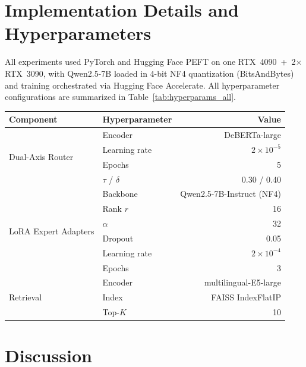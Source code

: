 \documentclass[a4paper,fleql]{cas-sc}
\begin{document}
\section{Implementation Details and Hyperparameters}
\label{sec:implementation}
All experiments used PyTorch and Hugging Face PEFT on one RTX~4090\ +\ 2$\times$RTX~3090, with Qwen2.5-7B loaded in 4-bit NF4 quantization (BitsAndBytes) and training orchestrated via Hugging Face Accelerate. All hyperparameter configurations are summarized in Table~\ref{tab:hyperparams_all}.

\vspace{6pt plus 4pt minus 3pt}
\begin{center}
\begingroup
{}
\label{tab:hyperparams_all}
\begin{tabular}{llr}
\toprule
\textbf{Component} & \textbf{Hyperparameter} & \textbf{Value} \\
\midrule
\multirow{4}{*}{Dual-Axis Router}
  & Encoder           & DeBERTa-large \\
  & Learning rate     & $2 \times 10^{-5}$ \\
  & Epochs            & 5 \\
  & $\tau$ / $\delta$ & 0.30 / 0.40 \\
\midrule
\multirow{6}{*}{LoRA Expert Adapters}
  & Backbone        & Qwen2.5-7B-Instruct (NF4) \\
  & Rank $r$        & 16 \\
  & $\alpha$        & 32 \\
  & Dropout         & 0.05 \\
  & Learning rate   & $2 \times 10^{-4}$ \\
  & Epochs          & 3 \\
\midrule
\multirow{3}{*}{Retrieval}
  & Encoder  & multilingual-E5-large \\
  & Index    & FAISS IndexFlatIP \\
  & Top-$K$  & 10 \\
\bottomrule
\end{tabular}
\endgroup
\end{center}
\vspace{6pt plus 4pt minus 3pt}

\section{Discussion}
\label{sec:discussion}
\end{document}
